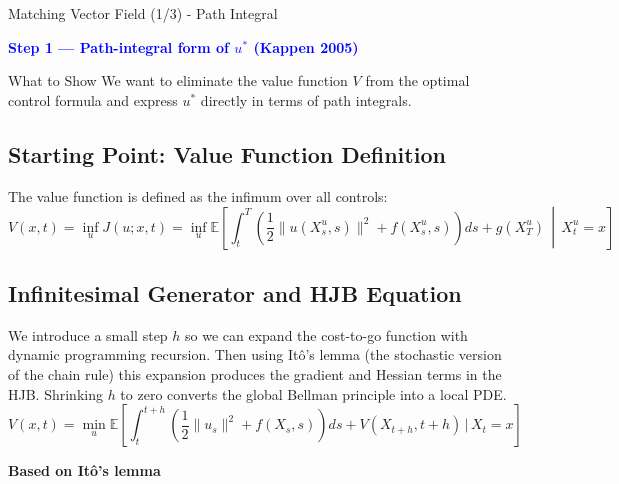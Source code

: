 \documentclass[aspectratio=169,xcolor=dvipsnames]{beamer}
\begin{document}
\begin{frame}[allowframebreaks]{Matching Vector Field (1/3) - Path Integral}
    \vspace{-0.3cm}
    
    \begin{center}
        \Large\textcolor{blue}{\textbf{Step 1 — Path-integral form of $u^*$ (Kappen 2005)}}
    \end{center}
    
    \vspace{0.3cm}
    
    \begin{block}{What to Show}
        We want to eliminate the value function $V$ from the optimal control formula and express $u^*$ directly in terms of path integrals.
    \end{block}
    
    \vspace{0.5cm}
    
    \subsection*{Starting Point: Value Function Definition}
    
    The value function is defined as the infimum over all controls:
    $$V(x,t) = \inf_u J(u; x,t) = \inf_u \mathbb{E}\left[\int_t^T \left(\frac{1}{2}\|u(X_s^u, s)\|^2 + f(X_s^u, s)\right) ds + g(X_T^u) \,\middle|\, X_t^u = x\right]$$
    
    
    \subsection*{Infinitesimal Generator and HJB Equation}

    \vspace{0.5cm}

    We introduce a small step $h$ so we can expand the cost-to-go function with dynamic programming recursion. Then using Itô's lemma (the stochastic version of the chain rule) this expansion produces the gradient and Hessian terms in the HJB. Shrinking $h$ to zero converts the global Bellman principle into a local PDE.
    $$V(x, t) = \min_{u} \mathbb{E}\left[ \int_{t}^{t+h} \left( \frac{1}{2} \|u_s\|^2 + f(X_s, s) \right) ds + V(X_{t+h}, t+h) \,\Big|\, X_t = x \right]$$
    
    \vspace{0.2cm}
    \textbf{Based on Itô's lemma}


\end{frame}
\end{document}
